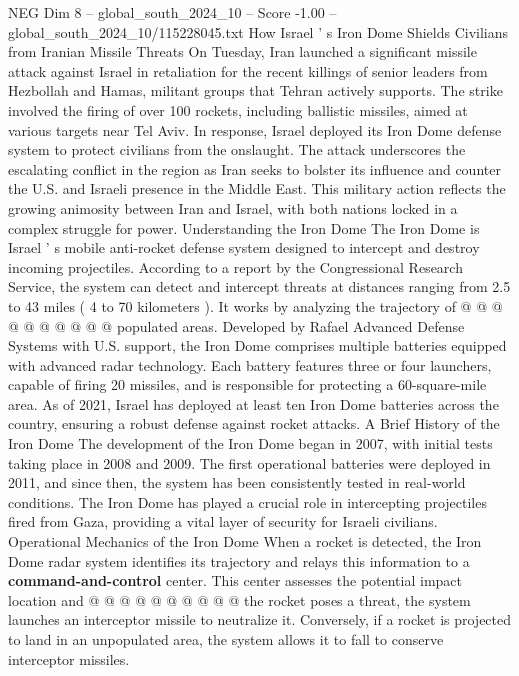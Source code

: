 \begin{textsample}{NEG Dim 8 – global\_south\_2024\_10 – Score -1.00 – global\_south\_2024\_10/115228045.txt}  \label{ex:f8_neg_141}
How Israel ' s Iron Dome Shields Civilians from Iranian Missile Threats On Tuesday, Iran launched a significant missile attack against Israel in retaliation for the recent killings of senior leaders from Hezbollah and Hamas, militant groups that Tehran actively supports.
The strike involved the firing of over 100 rockets, including ballistic missiles, aimed at various targets near Tel Aviv.
In response, Israel deployed its Iron Dome defense system to protect civilians from the onslaught.
The attack underscores the escalating conflict in the region as Iran seeks to bolster its influence and counter the U.S. and Israeli presence in the Middle East.
This military action reflects the growing animosity between Iran and Israel, with both nations locked in a complex struggle for power.
Understanding the Iron Dome The Iron Dome is Israel ' s mobile anti-rocket defense system designed to intercept and destroy incoming projectiles.
According to a report by the Congressional Research Service, the system can detect and intercept threats at distances ranging from 2.5 to 43 miles ( 4 to 70 kilometers ).
It works by analyzing the trajectory of @ @ @ @ @ @ @ @ @ @ populated areas.
Developed by Rafael Advanced Defense Systems with U.S. support, the Iron Dome comprises multiple batteries equipped with advanced radar technology.
Each battery features three or four launchers, capable of firing 20 missiles, and is responsible for protecting a 60-square-mile area.
As of 2021, Israel has deployed at least ten Iron Dome batteries across the country, ensuring a robust defense against rocket attacks.
A Brief History of the Iron Dome The development of the Iron Dome began in 2007, with initial tests taking place in 2008 and 2009.
The first operational batteries were deployed in 2011, and since then, the system has been consistently tested in real-world conditions.
The Iron Dome has played a crucial role in intercepting projectiles fired from Gaza, providing a vital layer of security for Israeli civilians.
Operational Mechanics of the Iron Dome When a rocket is detected, the Iron Dome radar system identifies its trajectory and relays this information to a \textbf{command-and-control} center.
This center assesses the potential impact location and @ @ @ @ @ @ @ @ @ @ the rocket poses a threat, the system launches an interceptor missile to neutralize it.
Conversely, if a rocket is projected to land in an unpopulated area, the system allows it to fall to conserve interceptor missiles.

\end{textsample}
